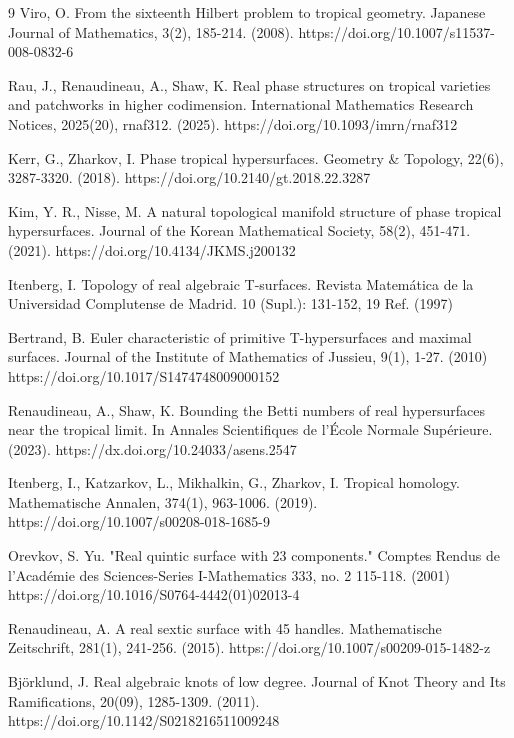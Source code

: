 \documentclass[pdflatex,sn-mathphys-num]{sn-jnl}%
\theoremstyle{thmstyleone}%
\theoremstyle{thmstyletwo}%
\theoremstyle{thmstylethree}%
\begin{document}
\begin{thebibliography}{9}
Viro, O. From the sixteenth Hilbert problem to tropical geometry. Japanese Journal of Mathematics, 3(2), 185-214. (2008). https://doi.org/10.1007/s11537-008-0832-6

Rau, J., Renaudineau, A., Shaw, K. Real phase structures on tropical varieties and patchworks in higher codimension. International Mathematics Research Notices, 2025(20), rnaf312. (2025). https://doi.org/10.1093/imrn/rnaf312 

Kerr, G., Zharkov, I. Phase tropical hypersurfaces. Geometry \& Topology, 22(6), 3287-3320.  (2018). https://doi.org/10.2140/gt.2018.22.3287

 Kim, Y. R., Nisse, M. A natural topological manifold structure of phase tropical hypersurfaces. Journal of the Korean Mathematical Society, 58(2), 451-471. (2021). https://doi.org/10.4134/JKMS.j200132


Itenberg, I. Topology of real algebraic T-surfaces. Revista Matemática de la Universidad Complutense de Madrid. 10 (Supl.): 131-152, 19 Ref. (1997)

Bertrand, B. Euler characteristic of primitive T-hypersurfaces and maximal surfaces. Journal of the Institute of Mathematics of Jussieu, 9(1), 1-27. (2010) https://doi.org/10.1017/S1474748009000152

 Renaudineau, A., Shaw, K. Bounding the Betti numbers of real hypersurfaces near the tropical limit. In Annales Scientifiques de l'École Normale Supérieure. (2023). https://dx.doi.org/10.24033/asens.2547

Itenberg, I., Katzarkov, L., Mikhalkin, G., Zharkov, I. Tropical homology. Mathematische Annalen, 374(1), 963-1006. (2019). https://doi.org/10.1007/s00208-018-1685-9

Orevkov, S. Yu. "Real quintic surface with 23 components." Comptes Rendus de l'Académie des Sciences-Series I-Mathematics 333, no. 2 115-118. (2001) https://doi.org/10.1016/S0764-4442(01)02013-4

Renaudineau, A. A real sextic surface with 45 handles. Mathematische Zeitschrift, 281(1), 241-256. (2015). https://doi.org/10.1007/s00209-015-1482-z

Björklund, J. Real algebraic knots of low degree. Journal of Knot Theory and Its Ramifications, 20(09), 1285-1309. (2011). https://doi.org/10.1142/S0218216511009248


\end{thebibliography}
\end{document}
